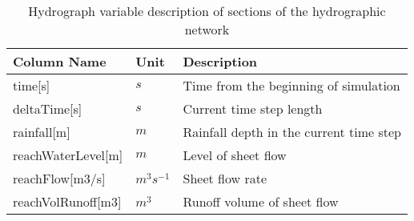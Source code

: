 
\begin{table}[t]
 \centering
 \caption{Hydrograph variable description of sections of the hydrographic network}
\label{tab:vystupytokdat}
\begin{tabular}{llp{}}
  \hline  \hline
 Column Name       & Unit       & Description                                      \\
 \hline
 time[s]              &   $s$              &  Time from the beginning of simulation                   \\
 deltaTime[s]         &   $s$              &  Current time step length            \\
 rainfall[m]          &  $m$               &  Rainfall depth in the current time step \\
 reachWaterLevel[m]        &  $m$          &  Level of sheet flow            \\
 reachFlow[m3/s]              &  $m^3s^{-1}$   &  Sheet flow rate                   \\
 reachVolRunoff[m3]           &  $m^3$         & Runoff volume of sheet flow    \\
  \hline  \hline
 \end{tabular}
\end{table}

